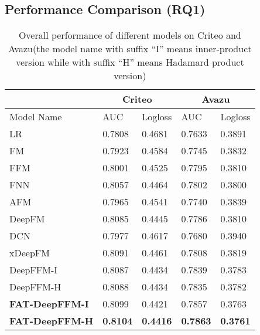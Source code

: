 \documentclass{article}
\begin{document}
\subsection{Performance Comparison (RQ1)}
\begin{table}[]
\centering
\caption{Overall performance of different models on Criteo and Avazu(the model name with suffix ``I'' means inner-product version while with suffix ``H'' means Hadamard product version)}
\label{table:t2}
\begin{tabular}{lllll}
\toprule
                       & \multicolumn{2}{c}{Criteo}        & \multicolumn{2}{c}{Avazu} 
                       \\\hline
Model Name             & AUC             & Logloss 
& AUC             & Logloss \\
\hline
LR                     & 0.7808          & 0.4681          & 0.7633          & 0.3891          \\
FM                     & 0.7923          & 0.4584          & 0.7745          & 0.3832          \\
FFM                    & 0.8001          & 0.4525          & 0.7795          & 0.3810           \\
FNN                    & 0.8057          & 0.4464          & 0.7802          & 0.3800            \\
AFM                    & 0.7965          & 0.4541          & 0.7740           & 0.3839          \\
DeepFM                 & 0.8085          & 0.4445          & 0.7786          & 0.3810           \\
DCN                    & 0.7977          & 0.4617          & 0.7680           & 0.3940           \\
xDeepFM                & 0.8091          & 0.4461          & 0.7808          & 0.3819          \\
\hline
DeepFFM-I & 0.8087 & 0.4434 & 0.7839 & 0.3783 \\
DeepFFM-H & 0.8088 & 0.4434 & 0.7835 & 0.3782 \\

\hline
\textbf{FAT-DeepFFM-I} & 0.8099          & 0.4421          & 0.7857          & 0.3763 \\
\textbf{FAT-DeepFFM-H} & \textbf{0.8104} & \textbf{0.4416} & \textbf{0.7863} & \textbf{0.3761}  \\\hline
\end{tabular}
\end{table}
\end{document}
